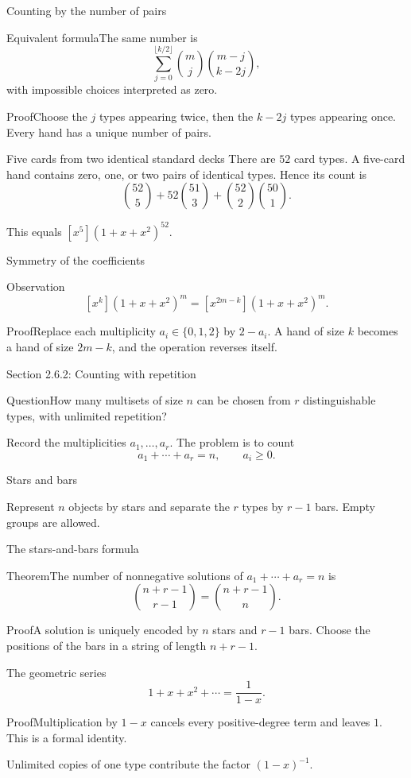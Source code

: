 \documentclass[aspectratio=169,11pt]{beamer}
\newcommand{\Thm}[2]{\begin{block}{#1}#2\end{block}}
\renewcommand{\Proof}[1]{\begin{block}{Proof}\normalsize #1\end{block}}
\newcommand{\Question}[1]{\begin{block}{Question}#1\end{block}}
\newcommand{\gap}{\par\medskip}
\begin{document}
\begin{frame}{Counting by the number of pairs}
\large
\Thm{Equivalent formula}{The same number is
\[\sum_{j=0}^{\lfloor k/2\rfloor}\binom mj\binom{m-j}{k-2j},\]
with impossible choices interpreted as zero.}
\Proof{Choose the $j$ types appearing twice, then the $k-2j$ types appearing once. Every hand has a unique number of pairs.}
\end{frame}
\begin{frame}{Five cards from two identical standard decks}
\large
There are $52$ card types. A five-card hand contains zero, one, or two pairs of identical types. Hence its count is
\[\binom{52}5+52\binom{51}3+\binom{52}2\binom{50}1.\]
\gap This equals $[x^5](1+x+x^2)^{52}$.
\end{frame}
\begin{frame}{Symmetry of the coefficients}
\large
\Thm{Observation}{\[[x^k](1+x+x^2)^m=[x^{2m-k}](1+x+x^2)^m.\]}
\Proof{Replace each multiplicity $a_i\in\{0,1,2\}$ by $2-a_i$. A hand of size $k$ becomes a hand of size $2m-k$, and the operation reverses itself.}
\end{frame}
\begin{frame}{Section 2.6.2: Counting with repetition}
\large
\Question{How many multisets of size $n$ can be chosen from $r$ distinguishable types, with unlimited repetition?}
\gap Record the multiplicities $a_1,\ldots,a_r$. The problem is to count
\[a_1+\cdots+a_r=n,\qquad a_i\geq0.\]
\end{frame}
\begin{frame}{Stars and bars}
\large
\begin{center}\end{center}
\gap Represent $n$ objects by stars and separate the $r$ types by $r-1$ bars. Empty groups are allowed.
\end{frame}
\begin{frame}{The stars-and-bars formula}
\large
\Thm{Theorem}{The number of nonnegative solutions of $a_1+\cdots+a_r=n$ is
\[\binom{n+r-1}{r-1}=\binom{n+r-1}n.\]}
\Proof{A solution is uniquely encoded by $n$ stars and $r-1$ bars. Choose the positions of the bars in a string of length $n+r-1$.}
\end{frame}
\begin{frame}{The geometric series}
\large
\[1+x+x^2+\cdots=\frac1{1-x}.\]
\Proof{Multiplication by $1-x$ cancels every positive-degree term and leaves $1$. This is a formal identity.}
\gap Unlimited copies of one type contribute the factor $(1-x)^{-1}$.
\end{frame}
\end{document}
